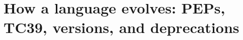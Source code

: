 \chapter{How a language evolves: PEPs, TC39, versions, and deprecations}
\label{ch:how-a-language-evolves-peps-tc39}

